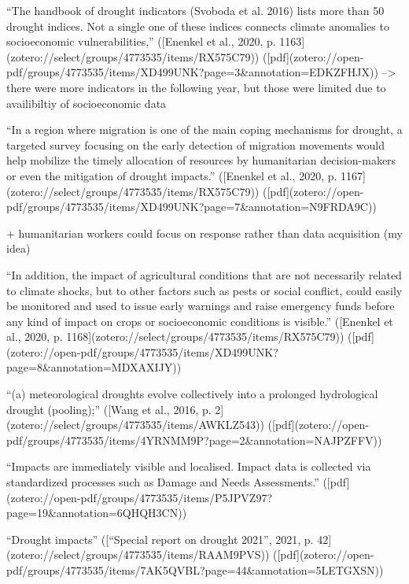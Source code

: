 {“The handbook of drought indicators (Svoboda et al. 2016) lists more than 50 drought indices. Not a single one of these indices connects climate anomalies to socioeconomic vulnerabilities,” ([Enenkel et al., 2020, p. 1163](zotero://select/groups/4773535/items/RX575C79)) ([pdf](zotero://open-pdf/groups/4773535/items/XD499UNK?page=3&annotation=EDKZFHJX))
--> there were more indicators in the following year, but those were limited due to availibiltiy of socioeconomic data

“In a region where migration is one of the main coping mechanisms for drought, a targeted survey focusing on the early detection of migration movements would help mobilize the timely allocation of resources by humanitarian decision-makers or even the mitigation of drought impacts.” ([Enenkel et al., 2020, p. 1167](zotero://select/groups/4773535/items/RX575C79)) ([pdf](zotero://open-pdf/groups/4773535/items/XD499UNK?page=7&annotation=N9FRDA9C))

+ humanitarian workers could focus on response rather than data acquisition (my idea)

“In addition, the impact of agricultural conditions that are not necessarily related to climate shocks, but to other factors such as pests or social conflict, could easily be monitored and used to issue early warnings and raise emergency funds before any kind of impact on crops or socioeconomic conditions is visible.” ([Enenkel et al., 2020, p. 1168](zotero://select/groups/4773535/items/RX575C79)) ([pdf](zotero://open-pdf/groups/4773535/items/XD499UNK?page=8&annotation=MDXAXIJY))

“(a) meteorological droughts evolve collectively into a prolonged hydrological drought (pooling);” ([Wang et al., 2016, p. 2](zotero://select/groups/4773535/items/AWKLZ543)) ([pdf](zotero://open-pdf/groups/4773535/items/4YRNMM9P?page=2&annotation=NAJPZFFV))


“Impacts are immediately visible and localised. Impact data is collected via standardized processes such as Damage and Needs Assessments.” ([pdf](zotero://open-pdf/groups/4773535/items/P5JPVZ97?page=19&annotation=6QHQH3CN))

“Drought impacts” ([“Special report on drought 2021”, 2021, p. 42](zotero://select/groups/4773535/items/RAAM9PVS)) ([pdf](zotero://open-pdf/groups/4773535/items/7AK5QVBL?page=44&annotation=5LETGXSN))


}
